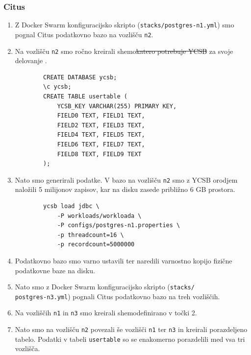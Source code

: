 \documentclass[a4paper, 12pt]{book}
\providecommand{\DIFaddtex}[1]{{\protect\color{blue}\uwave{#1}}} %
\providecommand{\DIFdeltex}[1]{{\protect\color{red}\sout{#1}}}                      %
\providecommand{\DIFaddbegin}{} %
\providecommand{\DIFaddend}{} %
\providecommand{\DIFdelbegin}{} %
\providecommand{\DIFdelend}{} %
\providecommand{\DIFadd}[1]{\texorpdfstring{\DIFaddtex{#1}}{#1}} %
\providecommand{\DIFdel}[1]{\texorpdfstring{\DIFdeltex{#1}}{}} %
\newcommand{\DIFscaledelfig}{0.5}
\newlength{\DIFdelgraphicswidth} %
\newlength{\DIFdelgraphicsheight} %
\newcommand{\DIFaddincludegraphics}[2][]{{\color{blue}\fbox{\DIFOincludegraphics[#1]{#2}}}} %
\newcommand{\DIFdelincludegraphics}[2][]{%
\sbox{\DIFdelgraphicsbox}{\DIFOincludegraphics[#1]{#2}}%
\settoboxwidth{\DIFdelgraphicswidth}{\DIFdelgraphicsbox} %
\settoboxtotalheight{\DIFdelgraphicsheight}{\DIFdelgraphicsbox} %
\scalebox{\DIFscaledelfig}{%
\parbox[b]{\DIFdelgraphicswidth}{\usebox{\DIFdelgraphicsbox}\\[-\baselineskip] \rule{\DIFdelgraphicswidth}{0em}}\llap{\resizebox{\DIFdelgraphicswidth}{\DIFdelgraphicsheight}{%
\setlength{\unitlength}{\DIFdelgraphicswidth}%
\begin{picture}(1,1)%
\thicklines\linethickness{2pt} %
{\color[rgb]{1,0,0}\put(0,0){\framebox(1,1){}}}%
{\color[rgb]{1,0,0}\put(0,0){\line( 1,1){1}}}%
{\color[rgb]{1,0,0}\put(0,1){\line(1,-1){1}}}%
\end{picture}%
}\hspace*{3pt}}} %
} %
\DeclareRobustCommand{\DIFaddbegin}{\DIFOaddbegin \let\includegraphics\DIFaddincludegraphics} %
\DeclareRobustCommand{\DIFaddend}{\DIFOaddend \let\includegraphics\DIFOincludegraphics} %
\DeclareRobustCommand{\DIFdelbegin}{\DIFOdelbegin \let\includegraphics\DIFdelincludegraphics} %
\DeclareRobustCommand{\DIFdelend}{\DIFOaddend \let\includegraphics\DIFOincludegraphics} %
\begin{document}
\subsubsection{Citus}
\begin{enumerate}
    \item Z Docker Swarm konfiguracijsko skripto (\texttt{stacks/postgres-n1.yml}) smo pognal Citus podatkovno bazo na vozlišču \texttt{n2}.
    \item Na vozlišču \texttt{n2} smo ročno kreirali shemo\DIFdelbegin \DIFdel{katero potrebuje YCSB }\DIFdelend \DIFaddbegin \DIFadd{, katero }\DIFaddend za svoje delovanje \DIFaddbegin \DIFadd{potrebuje YCSB}\DIFaddend .
    \begin{listing}[H]
    \begin{verbatim}
        CREATE DATABASE ycsb;
        \c ycsb;
        CREATE TABLE usertable (
            YCSB_KEY VARCHAR(255) PRIMARY KEY,
            FIELD0 TEXT, FIELD1 TEXT,
            FIELD2 TEXT, FIELD3 TEXT,
            FIELD4 TEXT, FIELD5 TEXT,
            FIELD6 TEXT, FIELD7 TEXT,
            FIELD8 TEXT, FIELD9 TEXT
        );
    \end{verbatim}
    \label{code-ycsb-schema-postgres}
    \end{listing}
    \item Nato smo generirali podatke. V bazo na vozlišču \texttt{n2} smo z YCSB orodjem naložili 5 milijonov zapisov, kar na disku zasede približno 6 GB prostora.
    \begin{listing}[H]
    \begin{verbatim}
        ycsb load jdbc \
            -P workloads/workloada \
            -P configs/postgres-n1.properties \
            -p threadcount=16 \
            -p recordcount=5000000
    \end{verbatim}
    \label{code-ycsb-load-postgres}
    \end{listing}
    \item Podatkovno bazo smo varno ustavili ter naredili varnostno kopijo fizične podatkovne baze na disku.
    \item Nato smo z Docker Swarm konfiguracijsko skripto (\texttt{stacks/\\postgres-n3.yml}) pognali Citus podatkovno bazo na treh vozliščih.
    \item Na vozliščih \texttt{n1} in \texttt{n3} smo kreirali shemo\DIFaddbegin \DIFadd{, }\DIFaddend definirano v točki 2.
    \item Nato smo na vozlišču \texttt{n2} povezali še vozlišči \texttt{n1} ter \texttt{n3} in kreirali porazdeljeno tabelo. Podatki v tabeli \texttt{usertable} so se enakomerno porazdelili med vsa tri vozlišča.

\end{enumerate}
\end{document}

